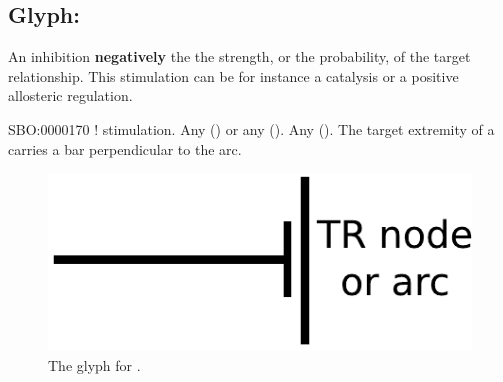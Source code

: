 
\subsection{Glyph: }\label{sec:inhibition}
\color{blue}

An inhibition \textbf{negatively}  the the strength, or the probability, of the target relationship. This stimulation can be for instance a catalysis or a positive allosteric regulation.

\begin{glyphDescription}
 \glyphSboTerm SBO:0000170 ! stimulation.
 \glyphOrigin Any  () or any  ().
 \glyphTarget Any  ().
 \glyphEndPoint The target extremity of a  carries a bar perpendicular to the arc.
 \end{glyphDescription}

\begin{figure}[H]
  \centering
  \includegraphics[scale = 0.5]{images/inhibition}
  \caption{The \PD glyph for .}
  \label{fig:inhibition}
\end{figure}


